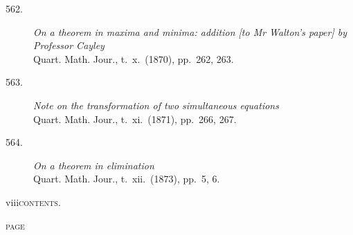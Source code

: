 \documentclass[11pt]{article}
\begin{document}
\begin{description}
\item[562.] \textit{On a theorem in maxima and minima: addition [to Mr Walton's paper] by Professor Cayley}\\
\hspace*{1em}\small Quart. Math. Jour., t.~x.\ (1870), pp.~262, 263.

\item[563.] \textit{Note on the transformation of two simultaneous equations}\\
\hspace*{1em}\small Quart. Math. Jour., t.~xi.\ (1871), pp.~266, 267.

\item[564.] \textit{On a theorem in elimination}\\
\hspace*{1em}\small Quart. Math. Jour., t.~xii.\ (1873), pp.~5, 6.
\end{description}
\newpage

\thispagestyle{empty}
\noindent\small viii\hfill\textsc{contents.}
\vspace*{1em}

\noindent\hfill\textsc{page}

\medskip
\end{document}
